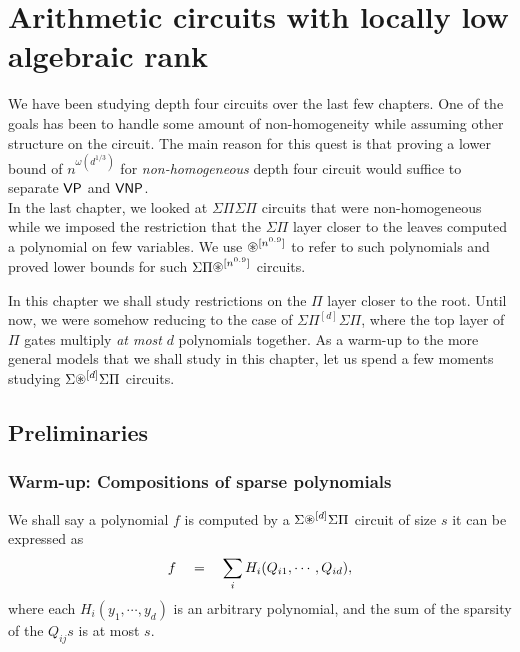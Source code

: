 \chapter{Arithmetic circuits with locally low algebraic rank}
\label{chap:lowAlgRank}

\newcommand{\spnew}{\Sigma{\Pi^{(k)}}\Sigma\Pi}
\newcommand{\spnewn}{\Sigma{\Pi^{(n)}}\Sigma\Pi}
\newcommand{\spnewbounded}{\Sigma{\Pi^{(k)}}\Sigma\Pi^{[d]}}
\newcommand{\spgeneral}{\Sigma{\Gamma^{(k)}}\Sigma\Pi}
\newcommand{\algRank}{\operatorname{\mathrm{algRank}}}

\def\h{\mathsf{Hom}}

We have been studying depth four circuits over the last few chapters. One of the goals has been to handle some amount of non-homogeneity while assuming other structure on the circuit. The main reason for this quest is that proving a lower bound of $n^{\omega(d^{1/3})}$ for \emph{non-homogeneous} depth four circuit would suffice to separate $\mathsf{VP}$ and $\mathsf{VNP}$. \\

In the last chapter, we looked at $\Sigma\Pi\Sigma\Pi$ circuits that were non-homogeneous while we imposed the restriction that the $\Sigma\Pi$ layer closer to the leaves computed a polynomial on few variables. We use $\circast^{[n^{0.9}]}$ to refer to such polynomials and proved lower bounds for such $\SPA^{[n^{0.9}]}$ circuits. 

In this chapter we shall study restrictions on the $\Pi$ layer closer to the root. Until now, we were somehow reducing to the case of $\Sigma\Pi^{[d]}\Sigma\Pi$, where the top layer of $\Pi$ gates multiply \emph{at most} $d$ polynomials together. As a warm-up to the more general models that we shall study in this chapter, let us spend a few moments studying $\Sigma\circast^{[d]}\Sigma\Pi$ circuits. 

\section{Preliminaries}

\subsection{Warm-up: Compositions of sparse polynomials}

\begin{definition}
We shall say a polynomial $f$ is computed by a $\Sigma\circast^{[d]}\Sigma\Pi$ circuit of size $s$ it can be expressed as
\[
f \quad = \quad \sum_i H_i(Q_{i1},\cdots, Q_{id}),
\]
where each $H_i(y_1,\cdots, y_d)$ is an arbitrary polynomial, and the sum of the sparsity of the $Q_{ij}s$ is at most $s$. 
\end{definition}

